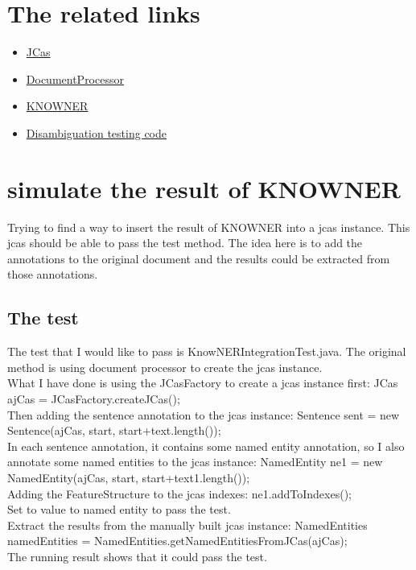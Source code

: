 \documentclass{article}
\begin{document}
\section{The related links}
\begin{itemize}
  \item \href{https://uima.apache.org/d/uimaj-current/apidocs/org/apache/uima/jcas/JCas.html}{JCas}
  \item \href{https://github.com/ambiverse-nlu/ambiverse-nlu/blob/341dc62abf47396aa04e6d0ca7c9e071b5d5b06e/src/main/java/de/mpg/mpi_inf/ambiversenlu/nlu/entitylinking/processor/DocumentProcessor.java}{DocumentProcessor}
  \item \href{https://github.com/ambiverse-nlu/ambiverse-nlu/blob/341dc62abf47396aa04e6d0ca7c9e071b5d5b06e/src/main/java/de/mpg/mpi_inf/ambiversenlu/nlu/ner/KnowNER.java}{KNOWNER}
  \item \href{https://github.com/ambiverse-nlu/ambiverse-nlu/blob/341dc62abf47396aa04e6d0ca7c9e071b5d5b06e/src/main/java/de/mpg/mpi_inf/ambiversenlu/nlu/entitylinking/uima/pipelines/DisambiguationPipeline.java}{Disambiguation testing code}
\end{itemize} 

\section{simulate the result of KNOWNER}
Trying to find a way to insert the result of KNOWNER into a jcas instance.
This jcas should be able to pass the test method.
The idea here is to add the annotations to the original document and the results could be extracted from those annotations. 
\subsection{The test}
The test that I would like to pass is KnowNERIntegrationTest.java.
The original method is using document processor to create the jcas instance.
\\
What I have done is using the JCasFactory to create a jcas instance first: JCas ajCas = JCasFactory.createJCas();
\\
Then adding the sentence annotation to the jcas instance: Sentence sent = new Sentence(ajCas, start, start+text.length());
\\
In each sentence annotation, it contains some named entity annotation, so I also annotate some named entities to the jcas instance: NamedEntity ne1 = new NamedEntity(ajCas, start, start+text1.length());
\\
Adding the FeatureStructure to the jcas indexes: ne1.addToIndexes();
\\
Set to value to named entity to pass the test. 
\\
Extract the results from the manually built jcas instance: NamedEntities namedEntities = NamedEntities.getNamedEntitiesFromJCas(ajCas);
\\
The running result shows that it could pass the test. 
\end{document}

